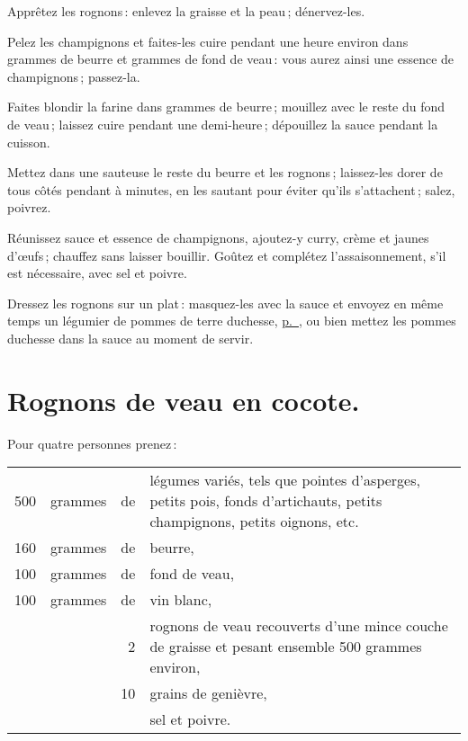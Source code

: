 Apprêtez les rognons : enlevez la graisse et la peau ; dénervez-les.

Pelez les champignons et faites-les cuire pendant une heure environ dans
{\mmm} grammes de beurre et {\mmm} grammes de fond de veau : vous
aurez ainsi une essence de champignons ; passez-la.

Faites blondir la farine dans {\mmm} grammes de beurre ; mouillez avec le reste du
fond de veau ; laissez cuire pendant une demi-heure ; dépouillez la sauce
pendant la cuisson.

Mettez dans une sauteuse le reste du beurre et les rognons ; laissez-les dorer
de tous côtés pendant {\mmm} à {\mmm} minutes, en les sautant pour
éviter qu'ils s'attachent ; salez, poivrez.

Réunissez sauce et essence de champignons, ajoutez-y curry, crème et jaunes
d'œufs ; chauffez sans laisser bouillir. Goûtez et complétez l'assaisonnement,
s'il est nécessaire, avec sel et poivre.

Dressez les rognons sur un plat : masquez-les avec la sauce et envoyez en même
temps un légumier de pommes de terre duchesse,
\hyperlink{p0725}{p. \pageref{pg0725}}, ou bien mettez les pommes duchesse dans la
sauce au moment de servir.

\section*{\centering Rognons de veau en cocote.}
{}

Pour quatre personnes prenez :

\medskip

\footnotesize
\begin{longtable}{rrrp{18em}}
    500 & grammes & de & légumes variés, tels que pointes d'asperges,
                         petits pois, fonds d'artichauts, petits champignons,
                         petits oignons, etc.                                                             \\
    160 & grammes & de & beurre,                                                                          \\
    100 & grammes & de & fond de veau,                                                                    \\
    100 & grammes & de & vin blanc,                                                                       \\
        &         &  2 & rognons de veau recouverts d'une mince couche de
                         graisse et pesant ensemble 500 grammes environ,                                  \\
        &         & 10 & grains de genièvre,                                                              \\
        &         &    & sel et poivre.                                                                   \\
\end{longtable}
\normalsize

